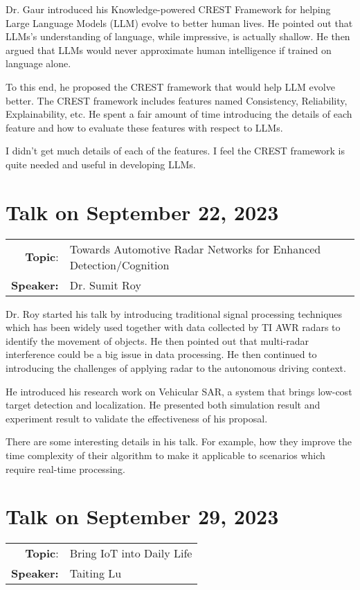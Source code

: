 \documentclass[11pt, oneside]{article}   	%
\begin{document}
Dr. Gaur introduced his Knowledge-powered CREST Framework for helping Large Language Models (LLM) evolve to better human lives. He pointed out that LLMs's understanding of language, while impressive, is actually shallow. He then argued that LLMs would never approximate human intelligence if trained on language alone.

To this end, he proposed the CREST framework that would help LLM evolve better. The CREST framework includes features named Consistency, Reliability, Explainability, etc. He spent a fair amount of time introducing the details of each feature and how to evaluate these features with respect to LLMs.

I didn't get much details of each of the features. I feel the CREST framework is quite needed and useful in developing LLMs.



\newpage
\section{Talk on September 22, 2023}
\begin{tabularx} {\textwidth}{r X}
\textbf{Topic}: & Towards Automotive Radar Networks for Enhanced Detection/Cognition \\
\textbf{Speaker:} & Dr. Sumit Roy\\
\end{tabularx}

Dr. Roy started his talk by introducing traditional signal processing techniques which has been widely used together with data collected by TI AWR radars to identify the movement of objects. He then pointed out that multi-radar interference could be a big issue in data processing. He then continued to introducing the challenges of applying radar to the autonomous driving context.

He introduced his research work on Vehicular SAR, a system that brings low-cost target detection and localization. He presented both simulation result and experiment result to validate the effectiveness of his proposal.

There are some interesting details in his talk. For example, how they improve the time complexity of their algorithm to make it applicable to scenarios which require  real-time processing.

\newpage
\section{Talk on September 29, 2023}
\begin{tabularx} {\textwidth}{r X}
\textbf{Topic}: & Bring IoT into Daily Life \\
\textbf{Speaker:} & Taiting Lu\\
\end{tabularx}
\end{document}
